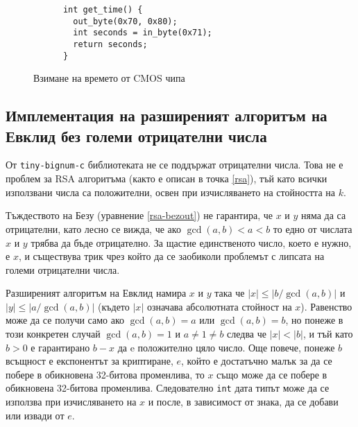   \begin{figure}[ht]
    \centering
    \begin{verbatim}
      int get_time() {
        out_byte(0x70, 0x80);
        int seconds = in_byte(0x71);
        return seconds;
      }
    \end{verbatim}
    \caption{Взимане на времето от CMOS чипа}
    \label{fig:cmos-time}
  \end{figure}

  \subsection{Имплементация на разширеният алгоритъм на Евклид без големи отрицателни числа}
  От {\tt tiny-bignum-c} библиотеката не се поддържат отрицателни числа. Това не е проблем за RSA алгоритъма (както е описан в точка \ref{rsa}), тъй като всички използвани числа са положителни, освен при изчисляването на стойността на $k$.

  Тъждеството на Безу (уравнение \ref{rsa-bezout}) не гарантира, че $x$ и $y$ няма да са отрицателни, като лесно се вижда, че ако $\gcd(a,b) < a < b$ то едно от числата $x$ и $y$ трябва да бъде отрицателно. За щастие единственото число, което е нужно, е $x$, и съществува трик чрез който да се заобиколи проблемът с липсата на големи отрицателни числа.

  Разширеният алгоритъм на Евклид намира $x$ и $y$ така че $|x|\leq|b/\gcd(a,b)|$ и $|y|\leq|a/\gcd(a,b)|$ (където $|x|$ означава абсолютната стойност на $x$). Равенство може да се получи само ако $\gcd(a,b)=a$ или $\gcd(a,b)=b$, но понеже в този конкретен случай $\gcd(a,b)=1$ и $a \neq 1 \neq b$ следва че $|x|<|b|$, и тъй като $b>0$ е гарантирано $b-x$ да e положително цяло число.
  Още повече, понеже $b$ всъщност е експонентът за криптиране, $e$, който е достатъчно малък за да се побере в обикновена 32-битова променлива, то $x$ също може да се побере в обикновена 32-битова променлива. Следователно {\tt int} дата типът може да се използва при изчисляването на $x$ и после, в зависимост от знака, да се добави или извади от $e$.

